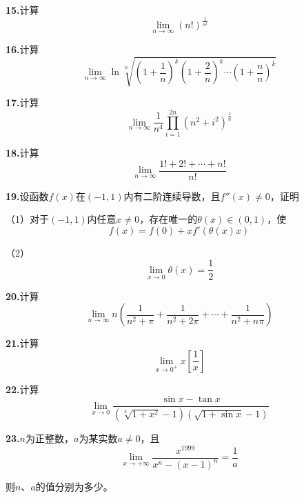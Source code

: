 \documentclass[10pt]{article}
\begin{document}
	\textbf{15.}计算
	$$
	\lim_{n\rightarrow \infty} \left( n! \right) ^{\frac{1}{n^2}}
	$$
	
	\textbf{16.}计算
	$$
	\lim_{n\rightarrow \infty} \ln \sqrt[n]{\left( 1+\frac{1}{n} \right) ^k\left( 1+\frac{2}{n} \right) ^k\cdots \left( 1+\frac{n}{n} \right) ^k}
	$$
	
	\textbf{17.}计算
	$$
	\lim_{n\rightarrow \infty} \frac{1}{n^4}\prod_{i=1}^{2n}{\left( n^2+i^2 \right) ^{\frac{1}{n}}}
	$$
	
	\textbf{18.}计算
	$$
	\lim_{n\rightarrow \infty} \frac{1!+2!+\cdots +n!}{n!}
	$$
	
	\textbf{19.}设函数$f\left( x \right)$在$\left( -1,1 \right)$内有二阶连续导数，且$f''\left( x \right) \ne 0$，证明
	
	（1）对于$\left( -1,1 \right)$内任意$x\ne 0$，存在唯一的$\theta \left( x \right) \in \left( 0,1 \right)$，使
	$$
	f\left( x \right) =f\left( 0 \right) +xf'\left( \theta \left( x \right) x \right)
	$$
	
	（2）
	$$
	\lim_{x\rightarrow 0} \theta \left( x \right) =\frac{1}{2}
	$$
	
	\textbf{20.}计算
	$$
	\lim_{n\rightarrow \infty} n\left( \frac{1}{n^2+\pi}+\frac{1}{n^2+2\pi}+\cdots +\frac{1}{n^2+n\pi} \right)
	$$
	
	\textbf{21.}计算
	$$
	\lim_{x\rightarrow 0^+} x\left[ \frac{1}{x} \right]
	$$
	
	\textbf{22.}计算
	$$
	\lim_{x\rightarrow 0} \frac{\sin x-\tan x}{\left( \sqrt[3]{1+x^2}-1 \right) \left( \sqrt{1+\sin x}-1 \right)}
	$$
	
	\textbf{23.}$n$为正整数，$a$为某实数$a\ne0$，且
	$$
	\lim_{x\rightarrow +\infty} \frac{x^{1999}}{x^n-\left( x-1 \right) ^n}=\frac{1}{a}
	$$
	
	则$n$、$a$的值分别为多少。
	
\end{document}
